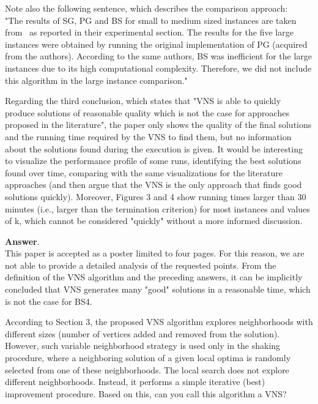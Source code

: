 \documentclass [11pt]{scrartcl}
\begin{document}
\begin{enumerate}
	Note also the following sentence, which describes the comparison approach:\\
	"The results of SG, PG and BS for small to medium sized instances are taken from~\cite{corcoran2021heuristics} as reported in their experimental section. The results for the five large instances were obtained by running the original implementation of PG (acquired from the authors). According to the same authors, BS was inefficient for the large instances due to its high computational complexity. Therefore, we did not include this algorithm in the large instance comparison."
	
	\textbf{Answer}. \\
	This paper is accepted as a poster limited to four pages. For this reason, we are not able to provide a detailed analysis of the requested points. From the definition of the VNS algorithm and the preceding answers, it can be implicitly concluded that VNS generates many "good" solutions in a reasonable time, which is not the case for BS4.
\end{enumerate}

\begin{leftbar}	
According to Section 3, the proposed VNS algorithm explores neighborhoods with different sizes (number of vertices added and removed from the solution). However, such variable neighborhood strategy is used only in the shaking procedure, where a neighboring solution of a given local optima is randomly selected from one of these neighborhoods. The local search does not explore different neighborhoods. Instead, it performs a simple iterative (best) improvement procedure. Based on this, can you call this algorithm a VNS?
\end{leftbar}
\end{document}
